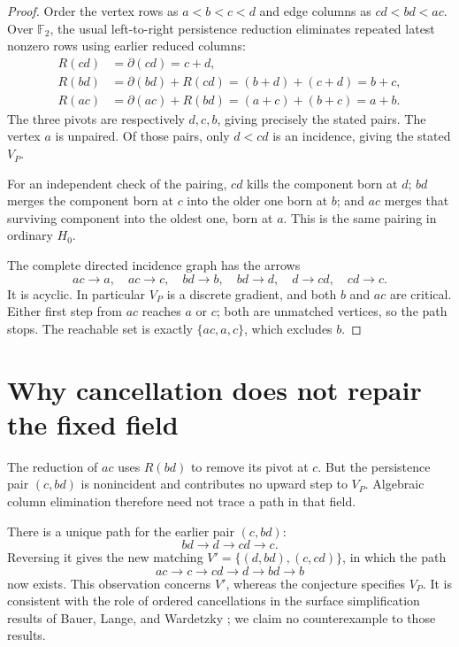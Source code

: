 \documentclass[11pt]{article}
\newcommand{\F}{\mathbb F}
\begin{document}
\begin{proof}
Order the vertex rows as $a<b<c<d$ and edge columns as $cd<bd<ac$.
Over $\F_2$, the usual left-to-right persistence reduction \cite{ELZ}
eliminates repeated latest nonzero rows using earlier reduced columns:
\begin{align*}
R(cd)&=\partial(cd)=c+d,\\
R(bd)&=\partial(bd)+R(cd)=(b+d)+(c+d)=b+c,\\
R(ac)&=\partial(ac)+R(bd)=(a+c)+(b+c)=a+b.
\end{align*}
The three pivots are respectively $d,c,b$, giving precisely the stated
pairs. The vertex $a$ is unpaired. Of those pairs, only $d<cd$ is an
incidence, giving the stated $V_P$.

For an independent check of the pairing, $cd$ kills the component born at
$d$; $bd$ merges the component born at $c$ into the older one born at $b$;
and $ac$ merges that surviving component into the oldest one, born at $a$.
This is the same pairing in ordinary $H_0$.

The complete directed incidence graph has the arrows
\[
 ac\to a,\quad ac\to c,\quad bd\to b,\quad bd\to d,
 \quad d\to cd,\quad cd\to c.
\]
It is acyclic. In particular $V_P$ is a discrete gradient, and both $b$
and $ac$ are critical. Either first step from $ac$ reaches $a$ or $c$;
both are unmatched vertices, so the path stops. The reachable set is
exactly $\{ac,a,c\}$, which excludes $b$.
\end{proof}

\section{Why cancellation does not repair the fixed field}
The reduction of $ac$ uses $R(bd)$ to remove its pivot at $c$. But the
persistence pair $(c,bd)$ is nonincident and contributes no upward step
to $V_P$. Algebraic column elimination therefore need not trace a path
in that field.

There is a unique path for the earlier pair $(c,bd)$:
\[
                  bd\to d\to cd\to c.
\]
Reversing it gives the new matching
$V'=\{(d,bd),(c,cd)\}$, in which the path
\[
                  ac\to c\to cd\to d\to bd\to b
\]
now exists. This observation concerns $V'$, whereas the conjecture specifies
$V_P$. It is consistent with the role of ordered cancellations in the
surface simplification results of Bauer, Lange, and Wardetzky
\cite[Lemma~9]{BLW}; we claim no counterexample to those results.
\end{document}
